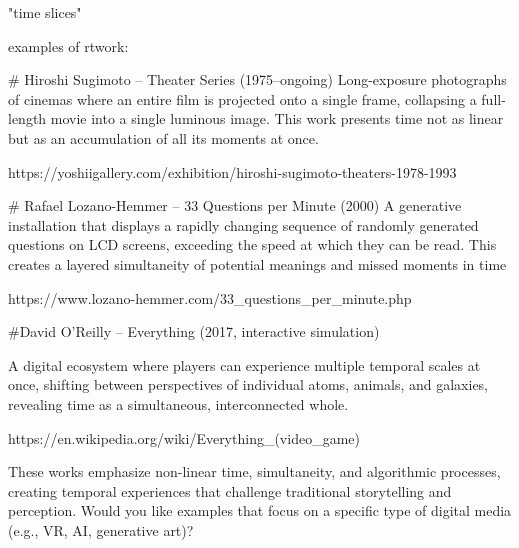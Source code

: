 

"time slices"

examples of rtwork: 

# Hiroshi Sugimoto – Theater Series (1975–ongoing)
Long-exposure photographs of cinemas where an entire film is projected onto a single frame, collapsing a full-length movie into a single luminous image. This work presents time not as linear but as an accumulation of all its moments at once.

https://yoshiigallery.com/exhibition/hiroshi-sugimoto-theaters-1978-1993


# Rafael Lozano-Hemmer – 33 Questions per Minute (2000)
A generative installation that displays a rapidly changing sequence of randomly generated questions on LCD screens, exceeding the speed at which they can be read. This creates a layered simultaneity of potential meanings and missed moments in time

https://www.lozano-hemmer.com/33_questions_per_minute.php



#David O’Reilly – Everything (2017, interactive simulation)

A digital ecosystem where players can experience multiple temporal scales at once, shifting between perspectives of individual atoms, animals, and galaxies, revealing time as a simultaneous, interconnected whole.

https://en.wikipedia.org/wiki/Everything_(video_game)

These works emphasize non-linear time, simultaneity, and algorithmic processes, creating temporal experiences that challenge traditional storytelling and perception. Would you like examples that focus on a specific type of digital media (e.g., VR, AI, generative art)?
